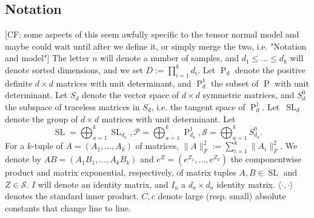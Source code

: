 \documentclass{article}
\newcommand\SL{\operatorname{SL}}
\newcommand\PD{\operatorname{P}}
\newcommand\Sym{\mathcal{S}}
\newcommand\smallSym{S}
\newcommand\SPD{\mathcal{P}}
\newcommand{\CF}[1]{{\color{purple}[CF: #1]}}
\begin{document}
\subsection{Notation}
\CF{some aspects of this seem awfully specific to the tensor normal model and maybe could wait until after we define it, or simply merge the two, i.e. "Notation and model"}
The letter $n$ will denote a number of samples, and $d_1\leq \dots \leq d_k$ will denote sorted dimensions, and we set $D:=\prod_{i = 1}^k d_i$. Let $\PD_d$ denote the positive definite $d\times d$ matrices with unit determinant, and $\PD_d^1$ the subset of $\PD$ with unit determinant. Let $\smallSym_d$ denote the vector space of $d\times d$ symmetric matrices, and $\smallSym^0_d$ the subspace of traceless matrices in $\smallSym_d$, i.e. the tangent space of $\PD_d^1$. Let~$\SL_d$ denote the group of $d\times d$ matrices with unit determinant.
Let 
$$\SL = \bigoplus_{a=1}^k \SL_{d_a}, \SPD = \bigoplus_{a = 1}^k \PD_{d_a}^1, \Sym = \bigoplus_{a = 1}^k \smallSym_{d_a}^0.$$ For a $k$-tuple of $A = (A_1, \dots, A_k)$ of matrices, $\|A\|_F^2:=\sum_{i = 1}^k \|A_i\|_F^2$. 
 We denote by $AB=(A_1B_1,\dots,A_kB_k)$ and $e^Z=(e^{Z_1},\dots,e^{Z_k})$ the componentwise product and matrix exponential, respectively, of matrix tuples $A, B \in \SL$ and $Z\in\Sym$. $I$ will denote an identity matrix, and $I_{a}$ a $d_a\times d_a$ identity matrix. $\langle \cdot, \cdot \rangle$ denotes the standard inner product. $C, c$ denote large (resp. small) absolute constants that change line to line.
\end{document}
